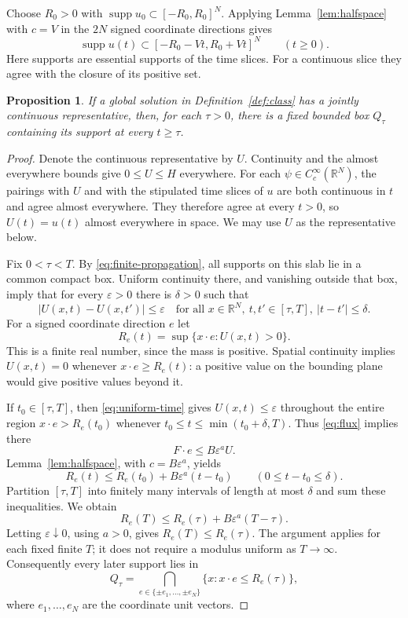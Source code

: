 \documentclass[11pt]{article}
\newtheorem{proposition}[theorem]{Proposition}
\theoremstyle{definition}
\newcommand{\R}{\mathbb R}
\newcommand{\supp}{\operatorname{supp}}
\begin{document}
Choose $R_0>0$ with $\supp u_0\subset[-R_0,R_0]^N$. Applying Lemma~\ref{lem:halfspace} with $c=V$ in the $2N$ signed coordinate directions gives
\begin{equation}\label{eq:finite-propagation}
 \supp u(t)\subset[-R_0-Vt,R_0+Vt]^N\qquad(t\ge0).
\end{equation}
Here supports are essential supports of the time slices. For a continuous slice they agree with the closure of its positive set.

\begin{proposition}\label{prop:confinement}
If a global solution in Definition~\ref{def:class} has a jointly continuous representative, then, for each $\tau>0$, there is a fixed bounded box $Q_\tau$ containing its support at every $t\ge\tau$.
\end{proposition}

\begin{proof}
Denote the continuous representative by $U$. Continuity and the almost everywhere bounds give $0\le U\le H$ everywhere. For each $\psi\in C_c^\infty(\R^N)$, the pairings with $U$ and with the stipulated time slices of $u$ are both continuous in $t$ and agree almost everywhere. They therefore agree at every $t>0$, so $U(t)=u(t)$ almost everywhere in space. We may use $U$ as the representative below.

Fix $0<\tau<T$. By \eqref{eq:finite-propagation}, all supports on this slab lie in a common compact box. Uniform continuity there, and vanishing outside that box, imply that for every $\varepsilon>0$ there is $\delta>0$ such that
\begin{equation}\label{eq:uniform-time}
 |U(x,t)-U(x,t')|\le\varepsilon
 \quad\text{for all }x\in\R^N,\ t,t'\in[\tau,T],\ |t-t'|\le\delta.
\end{equation}
For a signed coordinate direction $e$ let
\[
 R_e(t)=\sup\{x\cdot e:U(x,t)>0\}.
\]
This is a finite real number, since the mass is positive. Spatial continuity implies $U(x,t)=0$ whenever $x\cdot e\ge R_e(t)$: a positive value on the bounding plane would give positive values beyond it.

If $t_0\in[\tau,T]$, then \eqref{eq:uniform-time} gives $U(x,t)\le\varepsilon$ throughout the entire region $x\cdot e>R_e(t_0)$ whenever $t_0\le t\le\min(t_0+\delta,T)$. Thus \eqref{eq:flux} implies there
\[
 F\cdot e\le B\varepsilon^a U.
\]
Lemma~\ref{lem:halfspace}, with $c=B\varepsilon^a$, yields
\[
 R_e(t)\le R_e(t_0)+B\varepsilon^a(t-t_0)
 \qquad(0\le t-t_0\le\delta).
\]
Partition $[\tau,T]$ into finitely many intervals of length at most $\delta$ and sum these inequalities. We obtain
\[
 R_e(T)\le R_e(\tau)+B\varepsilon^a(T-\tau).
\]
Letting $\varepsilon\downarrow0$, using $a>0$, gives $R_e(T)\le R_e(\tau)$. The argument applies for each fixed finite $T$; it does not require a modulus uniform as $T\to\infty$. Consequently every later support lies in
\[
 Q_\tau=\bigcap_{e\in\{\pm e_1,\ldots,\pm e_N\}}
 \{x:x\cdot e\le R_e(\tau)\},
\]
where $e_1,\ldots,e_N$ are the coordinate unit vectors.
\end{proof}
\end{document}
